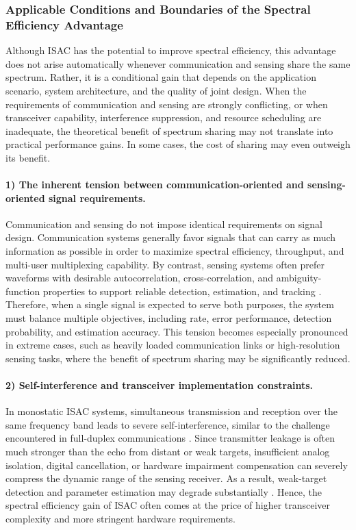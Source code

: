 \subsubsection{Applicable Conditions and Boundaries of the Spectral Efficiency Advantage}
\label{subsubsec:ch1-isac-core value-spectrum-boundary}

Although ISAC has the potential to improve spectral efficiency, this advantage does not arise automatically whenever communication and sensing share the same spectrum. Rather, it is a conditional gain that depends on the application scenario, system architecture, and the quality of joint design. When the requirements of communication and sensing are strongly conflicting, or when transceiver capability, interference suppression, and resource scheduling are inadequate, the theoretical benefit of spectrum sharing may not translate into practical performance gains. In some cases, the cost of sharing may even outweigh its benefit.

\paragraph{1) The inherent tension between communication-oriented and sensing-oriented signal requirements.}
Communication and sensing do not impose identical requirements on signal design. Communication systems generally favor signals that can carry as much information as possible in order to maximize spectral efficiency, throughput, and multi-user multiplexing capability. By contrast, sensing systems often prefer waveforms with desirable autocorrelation, cross-correlation, and ambiguity-function properties to support reliable detection, estimation, and tracking \cite{SkolnikRadarBook}. Therefore, when a single signal is expected to serve both purposes, the system must balance multiple objectives, including rate, error performance, detection probability, and estimation accuracy. This tension becomes especially pronounced in extreme cases, such as heavily loaded communication links or high-resolution sensing tasks, where the benefit of spectrum sharing may be significantly reduced.

\paragraph{2) Self-interference and transceiver implementation constraints.}
In monostatic ISAC systems, simultaneous transmission and reception over the same frequency band leads to severe self-interference, similar to the challenge encountered in full-duplex communications \cite{Sabharwal2014InBandFullDuplex}. Since transmitter leakage is often much stronger than the echo from distant or weak targets, insufficient analog isolation, digital cancellation, or hardware impairment compensation can severely compress the dynamic range of the sensing receiver. As a result, weak-target detection and parameter estimation may degrade substantially \cite{Gonzalez2024integrated,Bliss2007MIMOFullDuplex}. Hence, the spectral efficiency gain of ISAC often comes at the price of higher transceiver complexity and more stringent hardware requirements.

